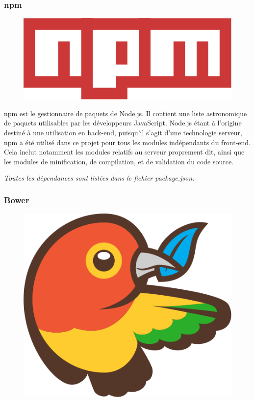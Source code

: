\documentclass[a4paper,12pt]{article}
\begin{document}
\subsubsection{npm}

\begin{figure}[!h]
  \begin{center}
    \includegraphics[scale=0.2]{logo-npm.png}
  \end{center}
\end{figure}

npm est le gestionnaire de paquets de Node.js. Il contient une liste astronomique de paquets utilisables par les développeurs JavaScript. Node.js étant à l'origine destiné à une utilisation en back-end, puisqu'il s'agit d'une technologie serveur, npm a été utilisé dans ce projet pour tous les modules indépendants du front-end. Cela inclut notamment les modules relatifs au serveur proprement dit, ainsi que les modules de minification, de compilation, et de validation du code source.

\textit{Toutes les dépendances sont listées dans le fichier package.json.}

\subsubsection{Bower}

\begin{figure}[!h]
  \begin{center}
    \includegraphics[scale=0.2]{logo-bower.png}
  \end{center}
\end{figure}
\end{document}
